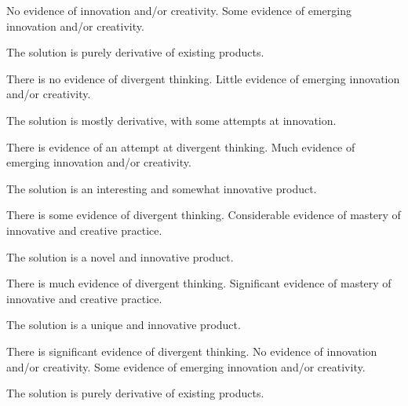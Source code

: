 \documentclass{../../fal_assignment}
\begin{document}
	\begin{markingrubric}
		\grade\fail No evidence of innovation and/or creativity.
		\grade Some evidence of emerging innovation and/or creativity.
		\par The solution is purely derivative of existing products.
		\par There is no evidence of divergent thinking.
		\grade Little evidence of emerging innovation and/or creativity.
		\par The solution is mostly derivative, with some attempts at innovation.
		\par There is evidence of an attempt at divergent thinking.
		\grade Much evidence of emerging innovation and/or creativity.
		\par The solution is an interesting and somewhat innovative product.
		\par There is some evidence of divergent thinking.
		\grade Considerable evidence of mastery of innovative and creative practice.
		\par The solution is a novel and innovative product.
		\par There is much evidence of divergent thinking.
		\grade Significant evidence of mastery of innovative and creative practice.
		\par The solution is a unique and innovative product.
		\par There is significant evidence of divergent thinking.
		\grade\fail No evidence of innovation and/or creativity.
		\grade Some evidence of emerging innovation and/or creativity.
		\par The solution is purely derivative of existing products.

\end{markingrubric}
\end{document}
